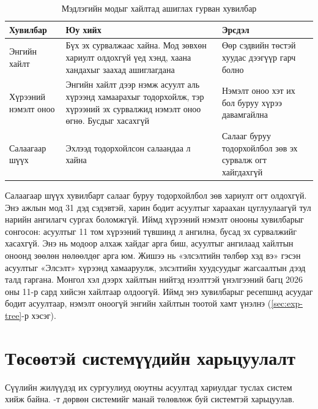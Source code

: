 \begin{table}[H]
\centering
\caption{Мэдлэгийн модыг хайлтад ашиглах гурван хувилбар}
\label{tab:tree_options}
\begin{tabular}{|p{2.6cm}|p{5.7cm}|p{5.3cm}|}
\hline
\textbf{Хувилбар} & \textbf{Юу хийх} & \textbf{Эрсдэл} \\
\hline
Энгийн хайлт & Бүх эх сурвалжаас хайна. Мод зөвхөн хариулт олдохгүй үед хэнд, хаана хандахыг заахад ашиглагдана & Өөр сэдвийн төстэй хуудас дээгүүр гарч болно \\
\hline
Хүрээний нэмэлт оноо & Энгийн хайлт дээр нэмж асуулт аль хүрээнд хамаарахыг тодорхойлж, тэр хүрээний эх сурвалжид нэмэлт оноо өгнө. Бусдыг хасахгүй & Нэмэлт оноо хэт их бол буруу хүрээ давамгайлна \\
\hline
Салаагаар шүүх & Эхлээд тодорхойлсон салаандаа л хайна & Салааг буруу тодорхойлбол зөв эх сурвалж огт хайгдахгүй \\
\hline
\end{tabular}
\end{table}

Салаагаар шүүх хувилбарт салааг буруу тодорхойлбол зөв хариулт огт олдохгүй. Энэ ажлын мод 31 дэд сэдэвтэй, харин бодит асуултыг хараахан цуглуулаагүй тул нарийн ангилагч сургах боломжгүй. Иймд хүрээний нэмэлт онооны хувилбарыг сонгосон: асуултыг 11 том хүрээний түвшинд л ангилна, бусад эх сурвалжийг хасахгүй. Энэ нь модоор алхаж хайдаг арга биш, асуултыг ангилаад хайлтын оноонд зөөлөн нөлөөлдөг арга юм. Жишээ нь «элсэлтийн төлбөр хэд вэ» гэсэн асуултыг «Элсэлт» хүрээнд хамааруулж, элсэлтийн хуудсуудыг жагсаалтын дээд талд гаргана. Монгол хэл дээрх хайлтын нийтэд нээлттэй үнэлгээний багц 2026 оны 11-р сард хийсэн хайлтаар олдоогүй. Иймд энэ хувилбарыг ресепшнд асуудаг бодит асуултаар, нэмэлт оноогүй энгийн хайлтын тоотой хамт үнэлнэ (\ref{sec:exp-tree}-р хэсэг).

\iffalse
\section{Төсөөтэй системүүдийн харьцуулалт}
\label{sec:lit-compare}

Сүүлийн жилүүдэд их сургуулиуд оюутны асуултад хариулдаг туслах систем хийж байна. -т дөрвөн системийг манай төлөвлөж буй системтэй харьцуулав.

